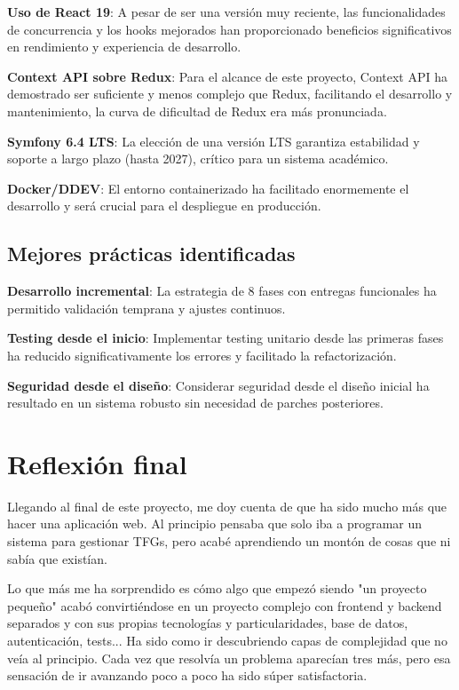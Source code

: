 \documentclass[12pt,a4paper,oneside]{report}
\begin{document}
\textbf{Uso de React 19}: A pesar de ser una versión muy reciente,
las funcionalidades de concurrencia y los hooks mejorados han
proporcionado beneficios significativos en rendimiento y experiencia de
desarrollo.

\textbf{Context API sobre Redux}: Para el alcance de este proyecto,
Context API ha demostrado ser suficiente y menos complejo que Redux,
facilitando el desarrollo y mantenimiento, la curva de dificultad de Redux era más pronunciada.

\textbf{Symfony 6.4 LTS}: La elección de una versión LTS garantiza
estabilidad y soporte a largo plazo (hasta 2027), crítico para un sistema académico.

\textbf{Docker/DDEV}: El entorno containerizado ha facilitado
enormemente el desarrollo y será crucial para el despliegue en
producción.

\subsection{Mejores prácticas
identificadas}\label{mejores-pruxe1cticas-identificadas}

\textbf{Desarrollo incremental}: La estrategia de 8 fases con entregas
funcionales ha permitido validación temprana y ajustes continuos.

\textbf{Testing desde el inicio}: Implementar testing unitario desde las
primeras fases ha reducido significativamente los errores y facilitado
la refactorización.

\textbf{Seguridad desde el diseño}: Considerar seguridad desde el diseño
inicial ha resultado en un sistema robusto sin necesidad de parches
posteriores.

\section{Reflexión final}\label{reflexiuxf3n-final}

Llegando al final de este proyecto, me doy cuenta de que ha sido mucho más que hacer una aplicación web. Al principio pensaba que solo iba a programar un sistema para gestionar TFGs, pero acabé aprendiendo un montón de cosas que ni sabía que existían.

Lo que más me ha sorprendido es cómo algo que empezó siendo "un proyecto pequeño" acabó convirtiéndose en un proyecto complejo con frontend y backend separados y con sus propias tecnologías y particularidades, base de datos, autenticación, tests... Ha sido como ir descubriendo capas de complejidad que no veía al principio. Cada vez que resolvía un problema aparecían tres más, pero esa sensación de ir avanzando poco a poco ha sido súper satisfactoria.
\end{document}
